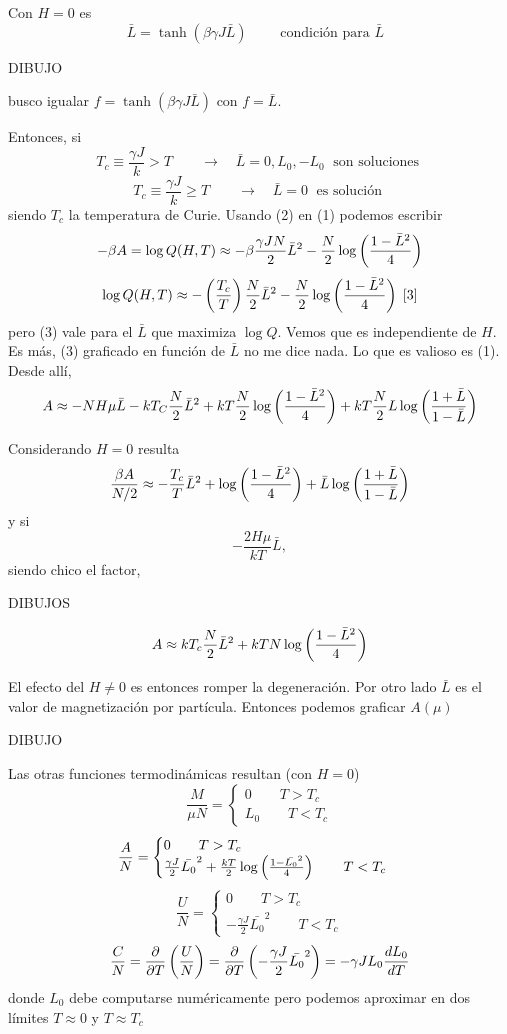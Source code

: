 \documentclass[10pt,oneside]{CBFT_book}
\begin{document}
Con $H=0$ es 
\[
	\boxed{ \bar{L} = \tanh( \beta \gamma J \bar{L} ) } \qquad \text{ condición para $\bar{L}$ }
\]

DIBUJO 

busco igualar $f=\tanh(\beta\gamma J\bar{L})$ con $f=\bar{L}$.

Entonces, si
\[
	T_c \equiv \frac{\gamma J}{k} > T \qquad \rightarrow \quad \bar{L} = 0, L_0, -L_0 \; 
	\text{ son soluciones } 
\]
\[
	T_c \equiv \frac{\gamma J}{k} \geq T \qquad \rightarrow \quad \bar{L} = 0 \; 
	\text{ es solución } 
\]
siendo $T_c$ la temperatura de Curie.
Usando (2) en (1) podemos escribir 
\[
	- \beta A = \log Q(H,T) \approx - \beta \frac{\gamma J N}{2} \bar{L}^2 
	- \frac{N}{2} \log \left( \frac{ 1-\bar{L}^2 }{ 4 } \right)
\]
\[
	\log Q(H,T) \approx - \left( \frac{ T_c }{ T } \right)\frac{N}{2}\bar{L}^2 - \frac{N}{2} \log \left( \frac{ 1-\bar{L}^2 }{ 4 } \right)
	\; [3]
\]
pero (3) vale para el $\bar{L}$ que maximiza $\log Q$. Vemos que es independiente de $H$.
Es más, (3) graficado en función de $\bar{L}$ no me dice nada. Lo que es valioso es (1).
Desde allí,
\[
	A \approx -NH\mu \bar{L} - kT_C \frac{N}{2}\bar{L}^2  + kT\frac{N}{2} \log \left( \frac{ 1-\bar{L}^2 }{ 4 } \right)
	+ kT \frac{N}{2} L \log \left( \frac{ 1+\bar{L} }{ 1-\bar{L} } \right)
\]

Considerando $H=0$ resulta
\[
	\frac{\beta A}{N/2} \approx -\frac{T_c}{T} \bar{L}^2 + \log \left( \frac{ 1-\bar{L}^2 }{ 4 } \right)
	+ \bar{L} \log \left( \frac{ 1+\bar{L} }{ 1-\bar{L} } \right)
\]
y si 
\[
	-\frac{2H\mu}{kT}\bar{L},
\]
siendo chico el factor,

DIBUJOS

\[
	A \approx k T_c \frac{N}{2} \bar{L}^2 + k T N \log \left( \frac{ 1-\bar{L}^2 }{ 4 } \right)
\]

El efecto del $H\neq 0$ es entonces romper la degeneración. Por otro lado $\bar{L}$ es el valor de
magnetización por partícula. Entonces podemos graficar $A(\mu)$

DIBUJO

Las otras funciones termodinámicas resultan (con $H=0$)
\[
	\frac{M}{\mu N} = \begin{cases}
	                   0 \qquad T > T_c \\
	                   L_0 \qquad T< T_c
	                  \end{cases}
\]
\[
	\frac{A}{N} = \begin{cases}
	                   0 \qquad T > T_c \\
	                   \frac{\gamma J}{2}\bar{L_0}^2 + \frac{kT}{2} \log \left( \frac{ 1-\bar{L_0}^2 }{ 4 } \right)
	                   \qquad T< T_c
	                  \end{cases}
\]
\[
	\frac{U}{N} = \begin{cases}
	                   0 \qquad T > T_c \\
	                   -\frac{\gamma J}{2}\bar{L_0}^2 \qquad T< T_c
	                  \end{cases}
\]
\[
	\frac{C}{N} = \frac{\partial^{\hspace{-0.05em}} {}}{\partial {T}^{\hspace{-0.05em}}}\left( \frac{ U }{ N } \right) = \frac{\partial^{\hspace{-0.05em}} {}}{\partial {T}^{\hspace{-0.05em}}}\left(-\frac{\gamma J}{2}\bar{L_0}^2 \right)
	= - \gamma J L_0 \frac{d^{\hspace{-0.05em}} {L_0}}{d {T}^{\hspace{-0.05em}}}
\]
donde $L_0$ debe computarse numéricamente pero podemos aproximar en dos límites $T\approx 0$ y $T\approx T_c$
\end{document}
